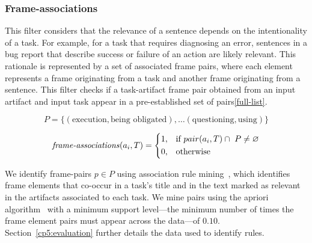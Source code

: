 \subsubsection{Frame-associations}

This filter considers that the relevance of a sentence depends on the intentionality of a task. 
For example, for a task that requires diagnosing an error, sentences in a bug report that describe success or failure 
of an action are likely relevant. 
This rationale is represented by a set of associated frame pairs, where each element represents a frame originating from a task and another frame originating from a sentence.
This filter checks if a task-artifact frame pair obtained from an input artifact and input task appear in a pre-established set of pairs\cref{full-list}.


\begin{small}
\begin{equation}
P = \{ (\text{execution}, \text{being obligated}), \dots (\text{questioning}, \text{using}) \} 
\end{equation}

\begin{equation}
\text{\textit{frame-associations}}(a_i, T) = \left \{
\begin{aligned}
    &1, && \text{if}\ pair(a_i, T) \cap ~P \ne \emptyset \\
    &0, && \text{otherwise}
\end{aligned} \right.
\end{equation} 
\end{small}



We identify frame-pairs $p \in P$ using association rule mining~\cite{agrawal1994apriori}, which identifies 
frame elements that co-occur in a task's title and in the text marked as relevant in the artifacts associated to each task.
We mine pairs using the apriori algorithm~\cite{apriori-python} with a minimum support level---the minimum number of times the frame element
pairs must appear across the data---of $0.10$. Section~\ref{cp5:evaluation} further details the data used to identify rules.









